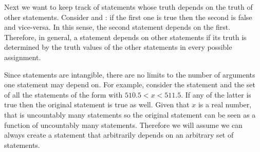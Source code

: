 \documentclass[11pt,letterpaper,fleqn]{memoir} %
\begin{document}
Next we want to keep track of statements whose truth depends on the truth of other statements. Consider  and : if the first one is true then the second is false and vice-versa. In this sense, the second statement depends on the first. Therefore, in general, a statement depends on other statements if its truth is determined by the truth values of the other statements in every possible assignment.

Since statements are intangible, there are no limits to the number of arguments one statement may depend on. For example, consider the statement  and the set of all the statements of the form  with $510.5 < x < 511.5$. If any of the latter is true then the original statement is true as well. Given that $x$ is a real number, that is uncountably many statements so the original statement can be seen as a function of uncountably many statements. Therefore we will assume we can always create a statement that arbitrarily depends on an arbitrary set of statements.
\end{document}
